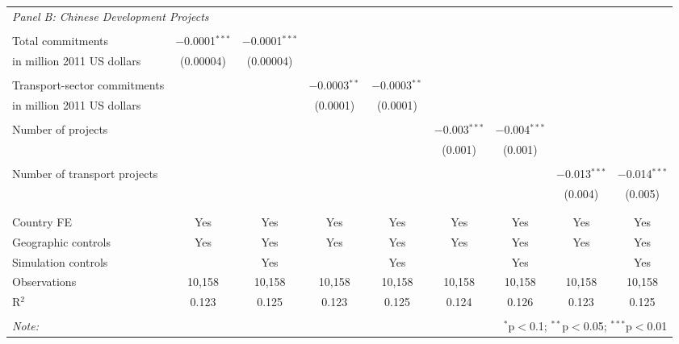 \documentclass[11pt, oneside]{article}   	%
\begin{document}
\begin{table}[!ph]
{\begin{tabular}{@{\extracolsep{5pt}}lcccccccc}
\multicolumn{9}{l}{\textit{Panel B: Chinese Development Projects}} \\
\\[-1.8ex]
Total commitments & $-$0.0001$^{***}$ & $-$0.0001$^{***}$ &  &  &  &  &  &  \\
 \hspace*{3mm} in million 2011 US dollars & (0.00004) & (0.00004) &  &  &  &  &  &  \\
 & & & & & & & & \\
Transport-sector commitments &  &  & $-$0.0003$^{**}$ & $-$0.0003$^{**}$ &  &  &  &  \\
 \hspace*{3mm} in million 2011 US dollars &  &  & (0.0001) & (0.0001) &  &  &  &  \\
 & & & & & & & & \\
Number of projects &  &  &  &  & $-$0.003$^{***}$ & $-$0.004$^{***}$ &  &  \\
 &  &  &  &  & (0.001) & (0.001) &  &  \\
 & & & & & & & & \\
Number of transport projects &  &  &  &  &  &  & $-$0.013$^{***}$ & $-$0.014$^{***}$ \\
 &  &  &  &  &  &  & (0.004) & (0.005) \\
 & & & & & & & & \\
 \\[-1.8ex]
Country FE & Yes & Yes & Yes & Yes & Yes & Yes & Yes & Yes \\
Geographic controls & Yes & Yes & Yes & Yes & Yes & Yes & Yes & Yes \\
Simulation controls &  & Yes &  & Yes &  & Yes &  & Yes \\
Observations & 10,158 & 10,158 & 10,158 & 10,158 & 10,158 & 10,158 & 10,158 & 10,158 \\
R$^{2}$ & 0.123 & 0.125 & 0.123 & 0.125 & 0.124 & 0.126 & 0.123 & 0.125 \\
 \hline
 \hline \\[-1.8ex]
 \textit{Note:}  & \multicolumn{8}{r}{$^{*}$p$<$0.1; $^{**}$p$<$0.05; $^{***}$p$<$0.01} \\
 \end{tabular}


}


\end{table}
\end{document}
